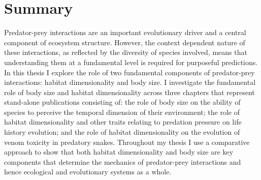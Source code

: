 \chapter*{Summary}

Predator-prey interactions are an important evolutionary driver and a central component of ecosystem structure. However, the context dependent nature of these interactions, as reflected by the diversity of species involved, means that understanding them at a fundamental level is required for purposeful predictions. In this thesis I explore the role of two fundamental components of predator-prey interactions: habitat dimensionality and body size. I investigate the fundamental role of body size and habitat dimensionality across three chapters that represent stand-alone publications consisting of: the role of body size on the ability of species to perceive the temporal dimension of their environment; the role of habitat dimensionality and other traits relating to predation pressure on life history evolution; and the role of habitat dimensionality on the evolution of venom toxicity in predatory snakes. Throughout my thesis I use a comparative approach to show that both habitat dimensionality and body size are key components that determine the mechanics of predator-prey interactions and hence ecological and evolutionary systems as a whole.

